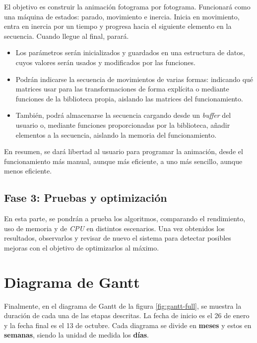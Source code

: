 El objetivo es construir la animación fotograma por fotograma. Funcionará como una máquina de estados: parado, movimiento e inercia. Inicia en movimiento, entra en inercia por un tiempo y progresa hacia el siguiente elemento en la secuencia. Cuando llegue al final, parará.

\begin{itemize}

    \item Los parámetros serán inicializados y guardados en una estructura de datos, cuyos valores serán usados y modificados por las funciones.

    \item Podrán indicarse la secuencia de movimientos de varias formas: indicando qué matrices usar para las transformaciones de forma explícita o mediante funciones de la biblioteca propia, aislando las matrices del funcionamiento.

    \item También, podrá almacenarse la secuencia cargando desde un \textit{buffer} del usuario o, mediante funciones proporcionadas por la biblioteca, añadir elementos a la secuencia, aislando la memoria del funcionamiento.

\end{itemize}

En resumen, se dará libertad al usuario para programar la animación, desde el funcionamiento más manual, aunque más eficiente, a uno más sencillo, aunque menos eficiente.

\subsection{Fase 3: Pruebas y optimización}\label{sub:phase-3}

En esta parte, se pondrán a prueba los algoritmos, comparando el rendimiento, uso de memoria y de \textit{CPU} en distintos escenarios. Una vez obtenidos los resultados, observarlos y revisar de nuevo el sistema para detectar posibles mejoras con el objetivo de optimizarlos al máximo.


\section{Diagrama de Gantt}
Finalmente, en el diagrama de Gantt de la figura \ref{fig:gantt-full}, se muestra la duración de cada una de las etapas descritas. La fecha de inicio es el 26 de enero y la fecha final es el 13 de octubre. Cada diagrama se divide en \textbf{meses} y estos en \textbf{semanas}, siendo la unidad de medida los \textbf{días}.

